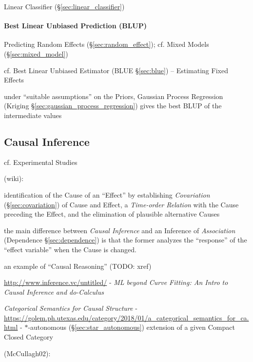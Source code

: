 \fist Linear Classifier (\S\ref{sec:linear_classifier})



\paragraph{Best Linear Unbiased Prediction (BLUP)}\label{sec:blup}\hfill

Predicting Random Effects (\S\ref{sec:random_effect});
cf. Mixed Models (\S\ref{sec:mixed_model})

cf. Best Linear Unbiased Estimator (BLUE \S\ref{sec:blue}) -- Estimating
Fixed Effects

under ``suitable assumptions'' on the Priors, Gaussian Process Regression
(Kriging \S\ref{sec:gaussian_process_regression}) gives the best BLUP of the
intermediate values



\subsection{Causal Inference}\label{sec:causal_inference}

cf. Experimental Studies

(wiki):

identification of the Cause of an ``Effect'' by establishing \emph{Covariation}
(\S\ref{sec:covariation}) of Cause and Effect, a \emph{Time-order Relation} with
the Cause preceding the Effect, and the elimination of plausible alternative
Causes

the main difference between \emph{Causal Inference} and an Inference of
\emph{Association} (Dependence \S\ref{sec:dependence}) is that the former
analyzes the ``response'' of the ``effect variable'' when the Cause is changed.

an example of ``Causal Reasoning'' (TODO: xref)

\url{http://www.inference.vc/untitled/} - \emph{ML beyond Curve Fitting: An
  Intro to Causal Inference and do-Calculus}

\emph{Categorical Semantics for Causal Structure} -
\url{https://golem.ph.utexas.edu/category/2018/01/a_categorical_semantics_for_ca.html}
- $*$-autonomous (\S\ref{sec:star_autonomous}) extension of a given Compact
Closed Category

(McCullagh02):

